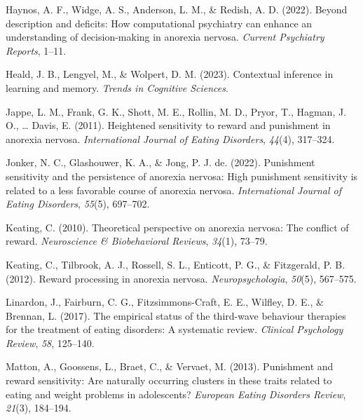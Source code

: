 \documentclass[
  man,floatsintext]{apa6}
\newlength{\cslhangindent}
\newlength{\cslentryspacingunit} %
\newenvironment{CSLReferences}[2] %
 {%
  \setlength{\parindent}{0pt}
  \ifodd #1
  \let\oldpar\par
  \def\par{\hangindent=\cslhangindent\oldpar}
  \fi
  \setlength{\parskip}{#2\cslentryspacingunit}
 }%
 {}
\begin{document}
\begin{CSLReferences}{1}{0}
\leavevmode{}%
Haynos, A. F., Widge, A. S., Anderson, L. M., \& Redish, A. D. (2022). Beyond description and deficits: How computational psychiatry can enhance an understanding of decision-making in anorexia nervosa. \emph{Current Psychiatry Reports}, 1--11.

\leavevmode{}%
Heald, J. B., Lengyel, M., \& Wolpert, D. M. (2023). Contextual inference in learning and memory. \emph{Trends in Cognitive Sciences}.

\leavevmode{}%
Jappe, L. M., Frank, G. K., Shott, M. E., Rollin, M. D., Pryor, T., Hagman, J. O., \ldots{} Davis, E. (2011). Heightened sensitivity to reward and punishment in anorexia nervosa. \emph{International Journal of Eating Disorders}, \emph{44}(4), 317--324.

\leavevmode{}%
Jonker, N. C., Glashouwer, K. A., \& Jong, P. J. de. (2022). Punishment sensitivity and the persistence of anorexia nervosa: High punishment sensitivity is related to a less favorable course of anorexia nervosa. \emph{International Journal of Eating Disorders}, \emph{55}(5), 697--702.

\leavevmode{}%
Keating, C. (2010). Theoretical perspective on anorexia nervosa: The conflict of reward. \emph{Neuroscience \& Biobehavioral Reviews}, \emph{34}(1), 73--79.

\leavevmode{}%
Keating, C., Tilbrook, A. J., Rossell, S. L., Enticott, P. G., \& Fitzgerald, P. B. (2012). Reward processing in anorexia nervosa. \emph{Neuropsychologia}, \emph{50}(5), 567--575.

\leavevmode{}%
Linardon, J., Fairburn, C. G., Fitzsimmons-Craft, E. E., Wilfley, D. E., \& Brennan, L. (2017). The empirical status of the third-wave behaviour therapies for the treatment of eating disorders: A systematic review. \emph{Clinical Psychology Review}, \emph{58}, 125--140.

\leavevmode{}%
Matton, A., Goossens, L., Braet, C., \& Vervaet, M. (2013). Punishment and reward sensitivity: Are naturally occurring clusters in these traits related to eating and weight problems in adolescents? \emph{European Eating Disorders Review}, \emph{21}(3), 184--194.


\end{CSLReferences}
\end{document}
